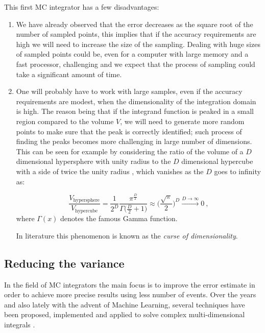 \documentclass[../main/main.tex]{subfiles}
\begin{document}
This first MC integrator has a few disadvantages:
\begin{enumerate}
\item We have already observed that the error decreases as the square root of the number of sampled points, 
	this implies that if the accuracy requirements are high we will need to increase the size of the sampling. 
	Dealing with huge sizes of sampled points could be, even for a computer with large memory and a fast processor, 
	challenging and we expect that the process of sampling could take a significant amount of time.
	\item One will probably have to work with large samples, even if the accuracy requirements are modest, when
	the dimensionality of the integration domain is high. The reason being that if the integrand function is peaked in a small
	region compared to the volume $V$, we will need to generate more random points to make sure that the peak is correctly 
	identified; such process of finding the peaks becomes more challenging in large number of dimensions.
	This can be seen for example by considering the ratio of the volume of a $D$ dimensional hypersphere with unity radius to the $D$ dimensional hypercube with a side of twice the unity radius , which vanishes as the $D$ goes to infinity as:
	
	\begin{equation}
		\frac{V_{\text{hypersphere}}}{V_{\text{hypercube} }} = \frac{1}{2^D} \frac{\pi^{\frac{D}{2}}}{\Gamma\big(\frac{D}{2} + 1\big)} \approx  \bigg( \frac{\sqrt{\pi}}{2} \bigg)^D \xrightarrow{D \rightarrow  \infty} 0 \ ,
	\end{equation}
	where $\Gamma(x)$ denotes the famous Gamma function.
	
	In literature this phenomenon is known as the \emph{curse of dimensionality}.
\end{enumerate}




\subsection{Reducing the variance}
\label{redu_var}
In the field of MC integrators the main focus is to improve the error estimate in order to achieve more precise results using less number of
events. Over the years and also lately with the advent of Machine Learning, several techniques have been proposed, implemented and applied to solve complex multi-dimensional integrals \cite{Lepage:2020tgj, Carrazza:2020rdn, unknown}.
\end{document}
